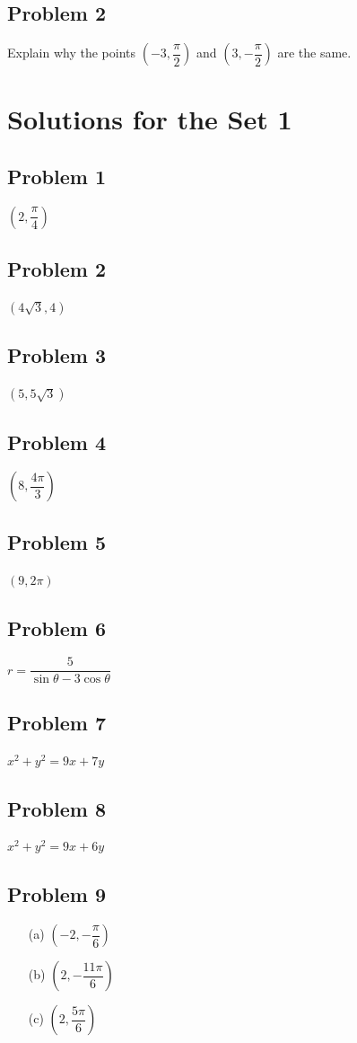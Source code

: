 \documentclass[12pt]{article}
\begin{document}
\subsection*{Problem 2}
Explain why the points \((-3,\dfrac{\pi}{2})\) and \((3,-\dfrac{\pi}{2})\) are the same.

\newpage
\section*{Solutions for the Set 1}
\subsection*{Problem 1}
\((2,\dfrac{\pi}{4})\)
\subsection*{Problem 2}
\((4\sqrt{3},4)\)
\subsection*{Problem 3}
\((5,5\sqrt{3})\)
\subsection*{Problem 4}
\((8,\dfrac{4\pi}{3})\)
\subsection*{Problem 5}
\((9,2\pi)\)
\subsection*{Problem 6}
\(r=\dfrac{5}{\sin \theta -3\cos \theta}\)
\subsection*{Problem 7}
\(x^2+y^2=9x+7y\)
\subsection*{Problem 8}
\(x^2+y^2=9x+6y\)
\subsection*{Problem 9}
    \begin{itemize}
        \item[(a)] \(\left( -2, -\dfrac{\pi}{6} \right)\)
        \item[(b)] \(\left( 2, -\dfrac{11\pi}{6} \right)\)
        \item[(c)] \(\left( 2, \dfrac{5\pi}{6} \right)\)
    \end{itemize}
    
\end{document}
